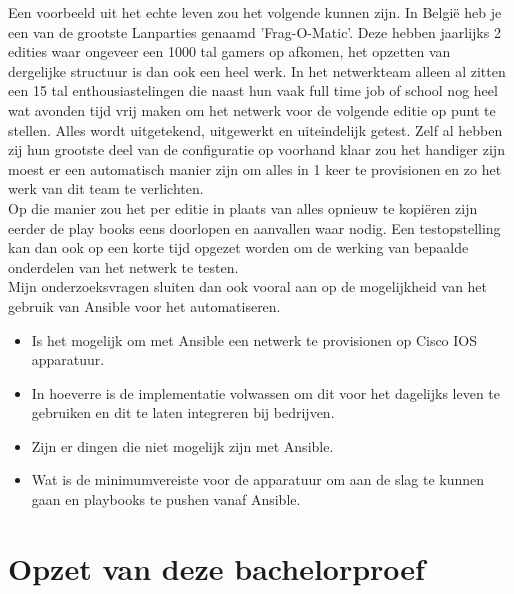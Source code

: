 Een voorbeeld uit het echte leven zou het volgende kunnen zijn.
In België heb je een van de grootste Lanparties genaamd 'Frag-O-Matic'. Deze hebben jaarlijks 2 edities waar ongeveer een 1000 tal gamers op afkomen, het opzetten van dergelijke structuur is dan ook een heel werk. In het netwerkteam alleen al zitten een 15 tal enthousiastelingen die naast hun vaak full time job of school nog heel wat avonden tijd vrij maken om het netwerk voor de volgende editie op punt te stellen. Alles wordt uitgetekend, uitgewerkt en uiteindelijk getest. Zelf al hebben zij hun grootste deel van de configuratie op voorhand klaar zou het handiger zijn moest er een automatisch manier zijn om alles in 1 keer te provisionen en zo het werk van dit team te verlichten. 
\\

Op die manier zou het per editie in plaats van alles opnieuw te kopiëren zijn eerder de play books eens doorlopen en aanvallen waar nodig. Een testopstelling kan dan ook op een korte tijd opgezet worden om de werking van bepaalde onderdelen van het netwerk te testen.
\\

Mijn onderzoeksvragen sluiten dan ook vooral aan op de mogelijkheid van het gebruik van Ansible voor het automatiseren.
\begin{itemize}
\item Is het mogelijk om met Ansible een netwerk te provisionen op Cisco IOS apparatuur.
\item In hoeverre is de implementatie volwassen om dit voor het dagelijks leven te gebruiken en dit te laten integreren bij bedrijven.
\item Zijn er dingen die niet mogelijk zijn met Ansible.
\item Wat is de minimumvereiste voor de apparatuur om aan de slag te kunnen gaan en playbooks te pushen vanaf Ansible.
\\
\end{itemize}



\section{Opzet van deze bachelorproef}
\label{sec:opzet-bachelorproef}

